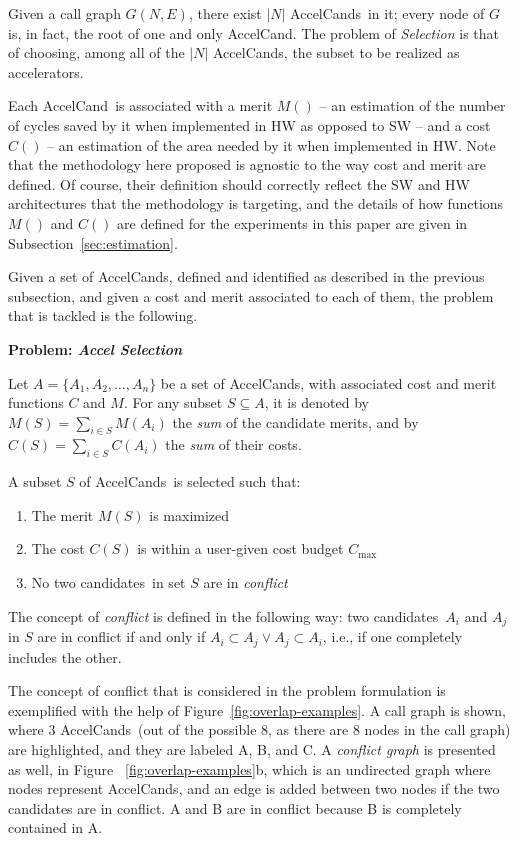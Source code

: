 \documentclass[]{usiinfthesis}
\newcommand{\candidate}{{AccelCand}}
\newcommand{\candidates}{{AccelCand}s}
\newcommand{\candidatesW}{candidates}
\newcommand{\asprobname}{\emph{Accel Selection}}
\begin{document}
Given a call graph $G(N,E)$, there exist $|N|$ \candidates\ in it;
every node of $G$ is, in fact, the root of one and only \candidate.
The problem of \emph{Selection} is that of choosing, among all of the
$|N|$ \candidates, the subset to be realized as accelerators.\par

Each \candidate\ is associated with a merit $M()$ -- an estimation of the
number of cycles saved by it when implemented in HW as opposed to SW --
and a cost $C()$ --  an estimation of the area needed by it when
implemented in HW. Note that the methodology here proposed is agnostic to
the way cost and merit are defined.
Of course, their definition should correctly reflect the SW and HW
architectures that the methodology is targeting, and the details of
how functions $M()$ and $C()$ are defined for the experiments in this
paper are given in Subsection~\ref{sec:estimation}.\par

Given a set of \candidates, defined and identified as described
in the previous subsection, and given a cost and merit associated to
each of them, the problem that is tackled is the following.\par

\textbf{Problem: \asprobname}

Let $A = \{ A_1, A_2, \ldots, A_n \}$ be a set of
\candidates, with associated cost and merit functions $C$ and $M$.
For any subset $S\subseteq A$, it is denoted by $M(S) = \sum_{i\in S} M(A_i)$ the 
\emph{sum} of the candidate merits, and by $C(S) = \sum_{i\in S} 
C(A_i)$ the \emph{sum} of their costs.\par

A subset $S$ of \candidates\ is selected such that:
\begin{enumerate}
\item The merit $M(S)$ is maximized
\item The cost $C(S)$ is within a user-given cost budget $C_{\max}$
\item No two \candidatesW\ in set $S$ are in \emph{conflict}
\end{enumerate}

The concept of \emph{conflict} is defined in the following way: two
\candidatesW\ $A_i$ and $A_j$ in $S$ are in conflict if and only if
$A_i\subset A_j \lor A_j\subset A_i$, i.e., if one completely includes the other.\par

The concept of conflict that is considered in the problem formulation is
exemplified with the help of Figure~\ref{fig:overlap-examples}. A call
graph is shown, where 3 \candidates\ (out of the possible 8, as there
are 8 nodes in the call graph) are highlighted, and they are labeled
A, B, and C. A \emph{conflict graph} is presented as well, in Figure
~\ref{fig:overlap-examples}b, which is an undirected graph where nodes
represent \candidates, and an edge is added between two nodes if the
two candidates are in conflict. A and B are in conflict because B is
completely contained in A.\par
\end{document}
